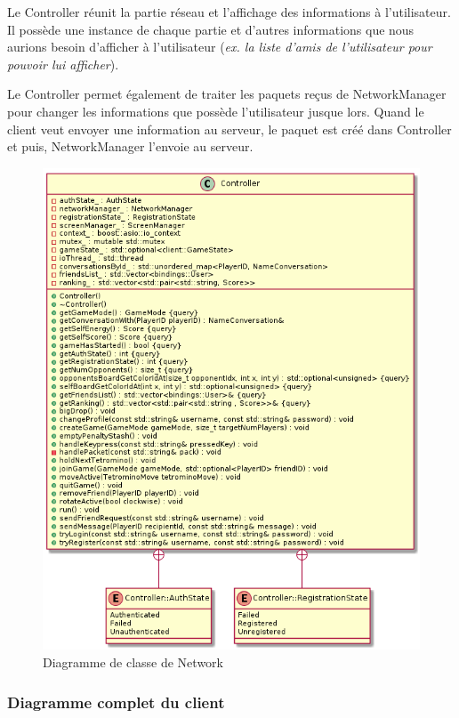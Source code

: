 \documentclass{article}
\begin{document}
Le Controller réunit la partie réseau et l'affichage des informations à l'utilisateur. Il possède une instance de chaque partie et d'autres informations que nous aurions besoin d'afficher à l'utilisateur (\textit{ex. la liste d'amis de l'utilisateur pour pouvoir lui afficher}). 

Le Controller permet également de traiter les paquets reçus de NetworkManager pour changer les informations que possède l'utilisateur jusque lors. Quand le client veut envoyer une information au serveur, le paquet est créé dans Controller et puis, NetworkManager l'envoie au serveur.

\begin{figure}[H]
	\centering
	 \includegraphics[scale=0.3]{../res/uml/class/ControllerClass.png}
	 \caption{Diagramme de classe de Network}
	 \label{fig:ControllerDiagram}
\end{figure}

\subsubsection{Diagramme complet du client}
\end{document}
